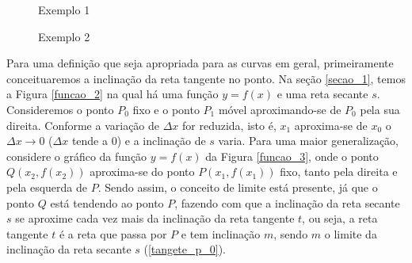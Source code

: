 \documentclass[
	12pt,				%
	openright,			%
    twoside,			%
	a4paper,			%
	chapter=TITLE,		%
	english,			%
	french,				%
	spanish,			%
	brazil				%
	]{abntex2}
\numberwithin{lema}{chapter}
\numberwithin{teorema}{chapter}
\numberwithin{definicao}{chapter}
\numberwithin{exemplo}{chapter}
\numberwithin{figure}{chapter}
\begin{document}
\begin{figure}[!h]
	\centering
	\begin{minipage}[!]{0.45\linewidth}
		\centering
		\caption{Exemplo 1}
		\label{exemplo_1}
	\end{minipage}
	\begin{minipage}[!]{0.45\linewidth}
		\centering
		\caption{Exemplo 2}
		\label{exemplo_2}
	\end{minipage}
\end{figure}

Para uma definição que seja apropriada para as curvas em geral, primeiramente conceituaremos a inclinação da reta tangente no ponto. Na seção \ref{secao_1}, temos a Figura \ref{funcao_2} na qual há uma função $ y = f(x) $ e uma reta secante $s$. Consideremos o ponto $P_0$ fixo e o ponto $P_1$ móvel aproximando-se de $P_0$ pela sua direita. Conforme a variação de $\Delta x$ for reduzida, isto é, $x_1$ aproxima-se de $x_0$ o $\Delta x \rightarrow 0$ ($\Delta x$ tende a 0) e a inclinação de $s$ varia. Para uma maior generalização, considere o gráfico da função $y = f(x)$ da Figura \ref{funcao_3}, onde o ponto $Q(x_2, f(x_2))$ aproxima-se do ponto $P(x_1, f(x_1))$ fixo, tanto pela direita e pela esquerda de $P$. Sendo assim, o conceito de limite está presente, já que o ponto $Q$ está tendendo ao ponto $P$, fazendo com que a inclinação da reta secante $s$ se aproxime cada vez mais da inclinação da reta tangente $t$, ou seja, a reta tangente $t$ é a reta que passa por $P$ e tem inclinação $m$, sendo $m$ o limite da inclinação da reta secante $s$ (\ref{tangete_p_0}). 
\end{document}
